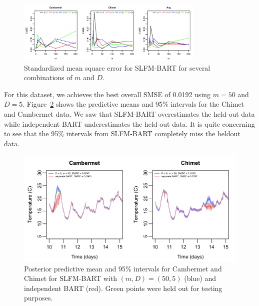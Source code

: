 \documentclass[12pt]{article}
\begin{document}
\begin{figure}[H]
\centering
\includegraphics[width = 0.8\textwidth]{../images/airtemp_slfm_smse.png}
\caption{Standardized mean square error for SLFM-BART for several combinations of $m$ and $D.$}
\label{fig:airtemp_slfm_smse}
\end{figure}

For this dataset, we achieves the best overall SMSE of 0.0192 using $m = 50$ and $D = 5.$
Figure~\ref{fig:airtemp_intervals} shows the predictive means and 95\% intervals for the Chimet and Cambermet data.
We saw that SLFM-BART overestimates the held-out data while independent BART underestimates the held-out data.
It is quite concerning to see that the 95\% intervals from SLFM-BART completely miss the heldout data. 

\begin{figure}[H]
\center
\includegraphics[width = \textwidth]{../images/airtemp_intervals.png}
\caption{Posterior predictive mean and 95\% intervals for Cambermet and Chimet for SLFM-BART with $(m,D) = (50, 5)$ (blue) and independent BART (red). Green points were held out for testing purposes.}
\label{fig:airtemp_intervals}
\end{figure}
\end{document}
